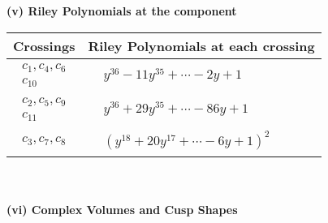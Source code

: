 \documentclass[1p]{elsarticle_modified}
\theoremstyle{definition}
\begin{document}
\newpage\renewcommand{\arraystretch}{1}
\flushleft \textbf{(v) Riley Polynomials at the component}\newline \\
\begin{tabular}{m{50pt}|m{274pt}}
Crossings & \hspace{64pt}Riley Polynomials at each crossing \\
\hline $$\begin{aligned}c_{1},c_{4},c_{6}\\c_{10}\end{aligned}$$&$\begin{aligned}
&y^{36}-11 y^{35}+\cdots-2 y+1
\end{aligned}$\\
\hline $$\begin{aligned}c_{2},c_{5},c_{9}\\c_{11}\end{aligned}$$&$\begin{aligned}
&y^{36}+29 y^{35}+\cdots-86 y+1
\end{aligned}$\\
\hline $$\begin{aligned}c_{3},c_{7},c_{8}\end{aligned}$$&$\begin{aligned}
&(y^{18}+20 y^{17}+\cdots-6 y+1)^{2}
\end{aligned}$\\
\hline
\end{tabular}\\~\\
\newpage\flushleft \textbf{(vi) Complex Volumes and Cusp Shapes}
\end{document}
